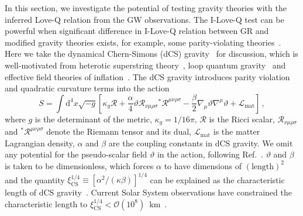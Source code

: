\documentclass[a4paper,11pt]{article}
\begin{document}
In this section, we investigate the potential of testing gravity theories with the 
inferred Love-Q relation from the GW observations. The I-Love-Q test can be 
powerful when significant difference in I-Love-Q relation between GR and modified 
gravity theories exists, for example, some parity-violating theories~\cite{Yagi_2017, Yunes:2025xwp}. 
Here we take the dynamical Chern-Simons (dCS) gravity~\cite{Jackiw:2003pm, Smith:2007jm,Alexander:2009tp} for discussion, 
which is well-motivated from heterotic superstring theory~\cite{Polchinski:1998rq,
Polchinski:1998rr}, loop quantum gravity~\cite{Alexander:2004xd,Taveras:2008yf,
Calcagni:2009xz} and effective field theories of inflation~\cite{Weinberg:2008hq}. 
The dCS gravity introduces parity violation and quadratic curvature terms into the action~\cite{Alexander:2009tp,Gupta:2017vsl}
\begin{equation}
   \label{cs_action}
   S = \int \mathrm{d}^4 x \sqrt{-g}\left[ \kappa_g \mathcal{R} + \frac{\alpha}{4} \mathcal{\vartheta} \mathcal{R}_{\nu\mu\rho\sigma} {}^{*}\mathcal{R}^{\mu\nu\rho\sigma} - \frac{\beta}{2}\nabla_{\mu}\mathcal{\vartheta}\nabla^{\mu}\mathcal{\vartheta} + \mathcal{L}_{\mathrm{mat}}\right]\,,
\end{equation}
where $g$ is the determinant of the metric, $\kappa_g= 1/16\pi$, $\mathcal{R}$ is 
the Ricci scalar, $\mathcal{R}_{\nu\mu\rho\sigma}$ and
$^{*}\mathcal{R}^{\mu\nu\rho\sigma}$ denote the Riemann tensor and its dual, 
$\mathcal{L}_{\mathrm{mat}}$ is the matter Lagrangian density, 
$\alpha$ and $\beta$ are the coupling constants in dCS gravity. We omit any 
potential for the pseudo-scalar field $\mathcal{\vartheta}$ in the action, 
following Ref.~\cite{Gupta:2017vsl}. $\mathcal{\vartheta}$ and $\beta$ is taken to be 
dimensionless, which forces $\alpha$ to have dimensions of $(\mathrm{length})^2$ 
and the quantity $\xi_{\mathrm{CS}}^{1/4} \equiv [\alpha^2/
(\kappa\beta)]^{1/4}$ can be explained as 
the characteristic length of dCS gravity~\cite{Yunes:2009hc,Yagi:2012ya}. 
Current Solar System observations have constrained the characteristic length to 
$\xi_{\mathrm{CS}}^{1/4}<\mathcal{O}(10^8)$~km~\cite{Ali-Haimoud:2011zme,Yagi:2012ya}. 
\end{document}
